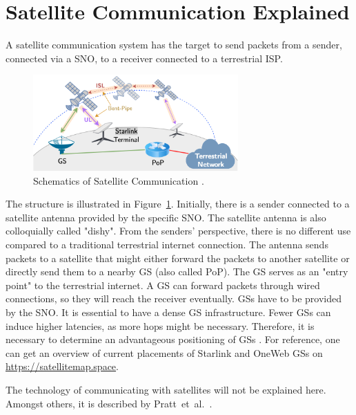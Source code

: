 \section{Satellite Communication Explained} \label{sec:satellite-communication-explained}

A satellite communication system has the target to send packets from a sender,
connected via a \ac{SNO}, to a receiver connected to a terrestrial ISP.

\begin{figure}[!ht]
	\centering
	\includegraphics[width=0.7\textwidth]{./chapters/2-background/img/satcom-structure-mohan.png}
	\caption{Schematics of Satellite Communication \cite{DBLP:conf/www/MohanFCBRMO24}.}
	\label{fig:sat-com-explained}
\end{figure}

The structure is illustrated in Figure~\ref{fig:sat-com-explained}.
Initially, there is a sender connected to a satellite antenna provided by the
specific \ac{SNO}. The satellite antenna is also colloquially called "dishy".
From the senders' perspective, there is no different use compared to a
traditional terrestrial internet connection. The antenna sends packets to a
satellite that might either forward the packets to another satellite or
directly send them to a nearby \ac{GS} (also called \ac{PoP}). The \ac{GS}
serves as an "entry point" to the terrestrial internet. A \ac{GS} can forward
packets through wired connections, so they will reach the receiver eventually.
\ac{GS}s have to be provided by the \ac{SNO}. It is essential to have a dense
\ac{GS} infrastructure. Fewer \ac{GS}s can induce higher latencies, as more
hops might be necessary. Therefore, it is necessary to determine an
advantageous positioning of \ac{GS}s \cite{DBLP:conf/sigcomm/VasishtSC21}. For
reference, one can get an overview of current placements of Starlink and OneWeb
\ac{GS}s on \url{https://satellitemap.space}.

The technology of communicating with satellites will not be explained here.
Amongst others, it is described by Pratt~et~al.~\cite{pratt2019satellite}.

